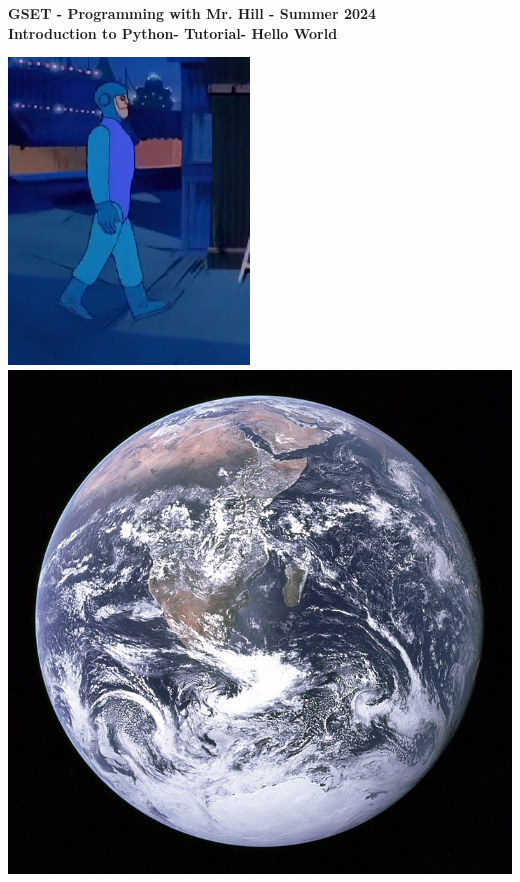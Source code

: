 \documentclass[12pt]{article}
\newcommand{\MNUM}{0} %
\newcommand{\MNAME}{Introduction to Python} %
\newcommand{\TNAME}{Hello World} %
\begin{document}
\thispagestyle{plain}

\begin{center}
   {\bf \large GSET - Programming with Mr. Hill - Summer 2024} \vspace{5mm}\\
   {\bf \Large \MNAME \hspc -  Tutorial\hspc\MNUM\hspc - \TNAME}\vspace{3mm}\\
   
\end{center}

 \hspace*{3cm}\includegraphics[scale=.6]{charlie_robot_sideview.png} \hspace*{1cm}\includegraphics[scale=.18]{blue_marble.jpg}
\end{document}
